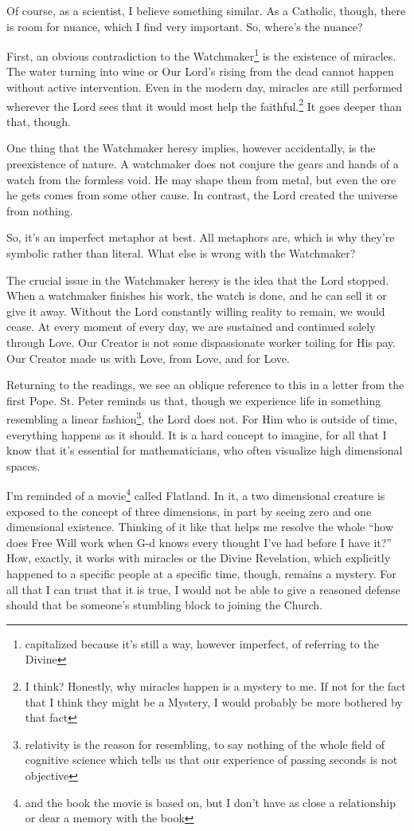 \documentclass[12pt]{article}[titlepage]
\newcommand{\say}[1]{``#1''}
\newcommand{\1}{\={a}}
\newcommand{\2}{\={e}}
\newcommand{\3}{\={\i}}
\newcommand{\4}{\=o}
\newcommand{\5}{\=u}
\newcommand{\6}{\={A}}
\renewcommand{\,}{\textsuperscript{,}}
\begin{document}
Of course, as a scientist, I believe something similar.
As a Catholic, though, there is room for nuance, which I find very important.
So, where's the nuance?

First, an obvious contradiction to the Watchmaker\footnote{capitalized because it's still a way, however imperfect, of referring to the Divine} is the existence of miracles.
The water turning into wine or Our Lord's rising from the dead cannot happen without active intervention.
Even in the modern day, miracles are still performed wherever the Lord sees that it would most help the faithful.\footnote{I think? Honestly, why miracles happen is a mystery to me. If not for the fact that I think they might be a Mystery, I would probably be more bothered by that fact}
It goes deeper than that, though.

One thing that the Watchmaker heresy implies, however accidentally, is the preexistence of nature.
A watchmaker does not conjure the gears and hands of a watch from the formless void.
He may shape them from metal, but even the ore he gets comes from some other cause.
In contrast, the Lord created the universe from nothing.

So, it's an imperfect metaphor at best.
All metaphors are, which is why they're symbolic rather than literal.
What else is wrong with the Watchmaker?

The crucial issue in the Watchmaker heresy is the idea that the Lord stopped.
When a watchmaker finishes his work, the watch is done, and he can sell it or give it away.
Without the Lord constantly willing reality to remain, we would cease.
At every moment of every day, we are sustained and continued solely through Love.
Our Creator is not some dispassionate worker toiling for His pay.
Our Creator made us with Love, from Love, and for Love.

Returning to the readings, we see an oblique reference to this in a letter from the first Pope.
St. Peter reminds us that, though we experience life in something resembling a linear fashion\footnote{relativity is the reason for resembling, to say nothing of the whole field of cognitive science which tells us that our experience of passing seconds is not objective}, the Lord does not.
For Him who is outside of time, everything happens as it should.
It is a hard concept to imagine, for all that I know that it's essential for mathematicians, who often visualize high dimensional spaces.

I'm reminded of a movie\footnote{and the book the movie is based on, but I don't have as close a relationship or dear a memory with the book} called Flatland.
In it, a two dimensional creature is exposed to the concept of three dimensions, in part by seeing zero and one dimensional existence.
Thinking of it like that helps me resolve the whole \say{how does Free Will work when G-d knows every thought I've had before I have it?}
How, exactly, it works with miracles or the Divine Revelation, which explicitly happened to a specific people at a specific time, though, remains a mystery.
For all that I can trust that it is true, I would not be able to give a reasoned defense should that be someone's stumbling block to joining the Church.
\end{document}
